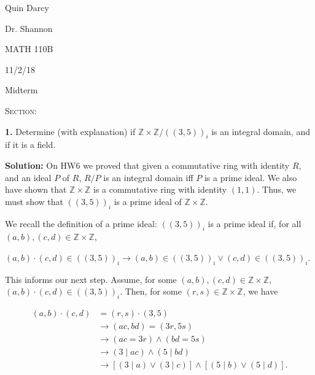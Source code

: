 \documentclass[12pt, a4paper]{article}
\begin{document}
  
 \begin{flushleft}
  
    Quin Darcy\par
    Dr. Shannon\par
    MATH 110B\par
    11/2/18
  
 \end{flushleft}
  
 \centerline{Midterm}
 
 \vspace{4mm}
 
 \noindent\textsc{Section: }\par
 
 \justifying
 
 \vspace{1mm}
 
 \hline
 
 \vspace{4mm}
 
 \noindent\textbf{1.} Determine (with explanation) if $\mathbb{Z}\times\mathbb{Z}/((3,5))_i$ is an integral domain, and if it is a field.
 
 \vspace{4mm}
 
 \noindent\textbf{Solution:} On HW6 we proved that given a commutative ring with identity $R$, and an ideal $P$ of $R$, $R/P$ is an integral domain iff $P$ is a prime ideal. We also have shown that $\mathbb{Z}\times\mathbb{Z}$ is a commutative ring with identity $(1,1)$. Thus, we must show that $((3,5))_i$ is a prime ideal of $\mathbb{Z}\times\mathbb{Z}$.\par We recall the definition of a prime ideal: $((3,5))_i$ is a prime ideal if, for all $(a,b),(c,d)\in\mathbb{Z}\times\mathbb{Z}$,\par 
 
 \vspace{4mm}
 
 \centerline{$(a,b)\cdot(c,d)\in((3,5))_i\rightarrow (a,b)\in((3,5))_i\vee(c,d)\in((3,5))_i$.}
 
 \vspace{4mm}
 
 This informs our next step. Assume, for some $(a,b),(c,d)\in\mathbb{Z}\times\mathbb{Z}$, $(a,b)\cdot(c,d)\in((3,5))_i$. Then, for some $(r,s)\in\mathbb{Z}\times\mathbb{Z}$, we have\par
 
     \begin{equation*}
        \begin{split}
            (a,b)\cdot(c,d)& = (r,s)\cdot(3,5) \\
            & \rightarrow(ac,bd) =  (3r,5s) \\
            & \rightarrow (ac=3r)\wedge (bd=5s) \\
            & \rightarrow (3\mid ac)\wedge (5\mid bd) \\
            & \rightarrow [(3\mid a)\vee (3\mid c)]\wedge[(5\mid b)\vee(5\mid d)]. \\
        \end{split}
    \end{equation*}
    
\end{document}
